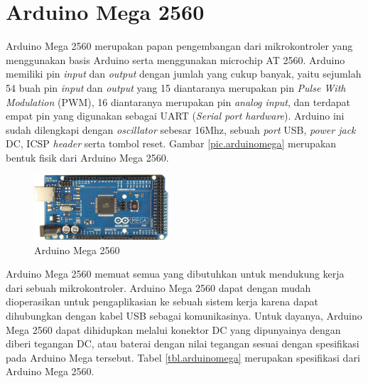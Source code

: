 \section{Arduino Mega 2560}
Arduino Mega 2560  merupakan papan pengembangan dari mikrokontroler yang menggunakan basis Arduino serta menggunakan microchip AT 2560. Arduino  memiliki pin \textit{input} dan \textit{output} dengan jumlah yang cukup banyak, yaitu sejumlah 54 buah pin \textit{input} dan \textit{output} yang 15 diantaranya merupakan pin \textit{Pulse With Modulation} (PWM), 16 diantaranya merupakan pin \textit{analog input}, dan terdapat empat pin yang digunakan sebagai UART (\textit{Serial port hardware}). Arduino ini sudah dilengkapi dengan \textit{oscillator} sebesar 16Mhz, sebuah \textit{port} USB, \textit{power jack} DC, ICSP \textit{header} serta tombol reset. Gambar \ref{pic.arduinomega} merupakan bentuk fisik dari Arduino Mega 2560.
	\begin{figure}[H]
	\centering
	\includegraphics[width=5cm]{gambar/arduino_mega.jpg}
	\caption{Arduino Mega 2560}
	\label{pic.arudinomega}
	\end{figure}

Arduino Mega 2560 memuat semua yang dibutuhkan untuk mendukung kerja dari sebuah mikrokontroler. Arduino Mega 2560 dapat dengan mudah dioperasikan untuk pengaplikasian ke sebuah sistem kerja karena dapat dihubungkan dengan kabel USB sebagai komunikasinya. Untuk dayanya, Arduino Mega 2560 dapat dihidupkan melalui konektor DC yang dipunyainya dengan diberi tegangan DC, atau baterai dengan nilai tegangan sesuai dengan spesifikasi pada Arduino Mega tersebut. Tabel \ref{tbl.arduinomega} merupakan spesifikasi dari Arduino Mega 2560.
\begin{table}[H]
	\centering
	\caption{ Spesifikasi Arduino Mega 2560 }
	\label{tbl.arduinomega}
\end{table}

